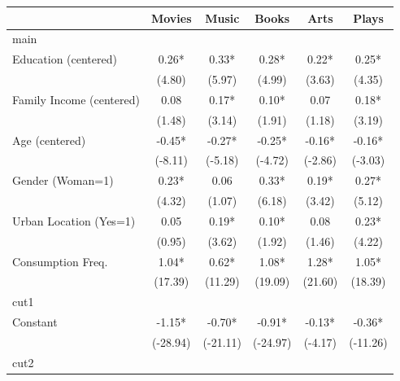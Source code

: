 {
\def\sym#1{\ifmmode^{#1}\else\(^{#1}\)\fi}
\begin{tabular*}{\hsize}{@{\hskip\tabcolsep\extracolsep\fill}l*{5}{c}}
\toprule
                    &\multicolumn{1}{c}{Movies}&\multicolumn{1}{c}{Music}&\multicolumn{1}{c}{Books}&\multicolumn{1}{c}{Arts}&\multicolumn{1}{c}{Plays}\\
\midrule
main                &             &             &             &             &             \\
Education (centered)&        0.26*&        0.33*&        0.28*&        0.22*&        0.25*\\
                    &      (4.80) &      (5.97) &      (4.99) &      (3.63) &      (4.35) \\
Family Income (centered)&        0.08 &        0.17*&        0.10*&        0.07 &        0.18*\\
                    &      (1.48) &      (3.14) &      (1.91) &      (1.18) &      (3.19) \\
Age (centered)      &       -0.45*&       -0.27*&       -0.25*&       -0.16*&       -0.16*\\
                    &     (-8.11) &     (-5.18) &     (-4.72) &     (-2.86) &     (-3.03) \\
Gender (Woman=1)    &        0.23*&        0.06 &        0.33*&        0.19*&        0.27*\\
                    &      (4.32) &      (1.07) &      (6.18) &      (3.42) &      (5.12) \\
Urban Location (Yes=1)&        0.05 &        0.19*&        0.10*&        0.08 &        0.23*\\
                    &      (0.95) &      (3.62) &      (1.92) &      (1.46) &      (4.22) \\
Consumption Freq.   &        1.04*&        0.62*&        1.08*&        1.28*&        1.05*\\
                    &     (17.39) &     (11.29) &     (19.09) &     (21.60) &     (18.39) \\
\midrule
cut1                &             &             &             &             &             \\
Constant            &       -1.15*&       -0.70*&       -0.91*&       -0.13*&       -0.36*\\
                    &    (-28.94) &    (-21.11) &    (-24.97) &     (-4.17) &    (-11.26) \\
\midrule
cut2                &             &             &             &             &             \\

\end{tabular*}}
